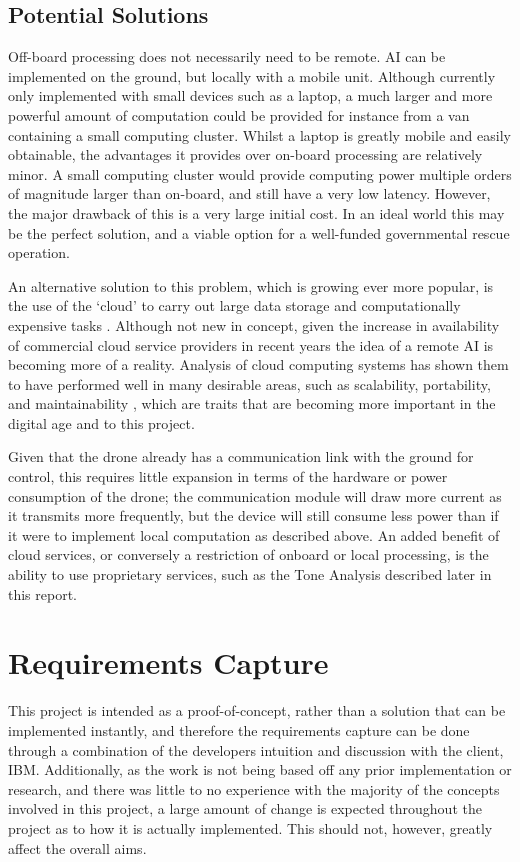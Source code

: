 \documentclass{article}
\begin{document}
\subsection{Potential Solutions}
Off-board processing does not necessarily need to be remote. AI can be implemented on the ground, but locally with a mobile unit. Although currently only implemented with small devices such as a laptop, a much larger and more powerful amount of computation could be provided for instance from a van containing a small computing cluster. Whilst a laptop is greatly mobile and easily obtainable, the advantages it provides over on-board processing are relatively minor. A small computing cluster would provide computing power multiple orders of magnitude larger than on-board, and still have a very low latency. However, the major drawback of this is a very large initial cost. In an ideal world this may be the perfect solution, and a viable option for a well-funded governmental rescue operation.

An alternative solution to this problem, which is growing ever more popular, is the use of the `cloud' to carry out large data storage and computationally expensive tasks \cite{CloudRobotics}. Although not new in concept, given the increase in availability of commercial cloud service providers in recent years the idea of a remote AI is becoming more of a reality. Analysis of cloud computing systems has shown them to have performed well in many desirable areas, such as scalability, portability, and maintainability \cite{SoftwareArchitecture}, which are traits that are becoming more important in the digital age and to this project. 

Given that the drone already has a communication link with the ground for control, this requires little expansion in terms of the hardware or power consumption of the drone; the communication module will draw more current as it transmits more frequently, but the device will still consume less power than if it were to implement local computation as described above. An added benefit of cloud services, or conversely a restriction of onboard or local processing, is the ability to use proprietary services, such as the Tone Analysis described later in this report.


\section{Requirements Capture}
This project is intended as a proof-of-concept, rather than a solution that can be implemented instantly, and therefore the requirements capture can be done through a combination of the developers intuition and discussion with the client, IBM. Additionally, as the work is not being based off any prior implementation or research, and there was little to no experience with the majority of the concepts involved in this project, a large amount of change is expected throughout the project as to how it is actually implemented. This should not, however, greatly affect the overall aims.
\end{document}
